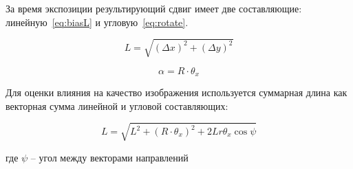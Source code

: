  
 За время экспозиции результирующий сдвиг имеет две составляющие: линейную~\eqref{eq:biasL} и угловую~\eqref{eq:rotate}.
 
 \begin{equation}
 	\label{eq:biasL}
 	L=\sqrt{(\Delta x)^2+(\Delta y)^2}
 \end{equation}
 
 \begin{equation}
 	\label{eq:rotate}
 	\alpha = R \cdot \theta_x
 \end{equation}
 
 
 Для оценки влияния на качество изображения используется суммарная длина  как векторная сумма линейной и угловой составляющих:
 
 \begin{equation}
 	\label{eq:L_total}
 	L = \sqrt{L^2 + (R\cdot \theta_x)^2 + 2Lr\theta_x\cos{\psi}}
 \end{equation}
 
 где \(\psi\) -- угол между векторами направлений 
 
